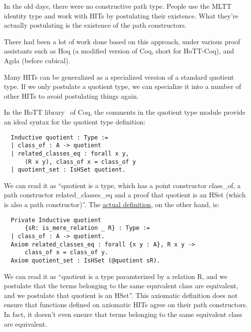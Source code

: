In the old days, there were no constructive path type.
People use the MLTT identity type and
work with HITs by postulating their existence.
What they're actually postulating is the existence of the path constructors.

There had been a lot of work done based on this approach,
under various proof assistants such as Hoq
(a modified version of Coq, short for HoTT-Coq),
and Agda (before cubical).

Many HITs can be generalized as a specialized version of a standard
quotient type. If we only postulate a quotient type, we can specialize
it into a number of other HITs to avoid postulating things again.

In the HoTT library~\cite{HottCoq} of Coq, the comments in the quotient
type module provide an ideal syntax for the quotient type definition:

\begin{verbatim}
  Inductive quotient : Type :=
  | class_of : A -> quotient
  | related_classes_eq : forall x y,
      (R x y), class_of x = class_of y
  | quotient_set : IsHSet quotient.
\end{verbatim}

We can read it as ``\textsf{quotient} is a type,
which has a point constructor \textsf{class\_of},
a path constructor \textsf{related\_classes\_eq}
and a proof that \textsf{quotient} is an HSet
(which is also a path constructor)''.
The \href{https://github.com/HoTT/HoTT/blob/b20bb573739284349a968bb219405255c744049d/theories/HIT/quotient.v#L40-L42}
{actual definition}, on the other hand, is:

\begin{verbatim}
  Private Inductive quotient
      {sR: is_mere_relation _ R} : Type :=
  | class_of : A -> quotient.
  Axiom related_classes_eq : forall {x y : A}, R x y ->
      class_of x = class_of y.  
  Axiom quotient_set : IsHSet (@quotient sR).
\end{verbatim}

We can read it as ``\textsf{quotient} is a type paramterized by a relation \textsf R,
and we postulate that the terms belonging to the same equivalent class are equivalent,
and we postulate that \textsf{quotient} is an HSet''.
This axiomatic definition does not ensure that functions defined on
axiomatic HITs agree on their path constructors.
In fact, it doesn't even ensure that terms belonging to the same equivalent
class are equivalent.



